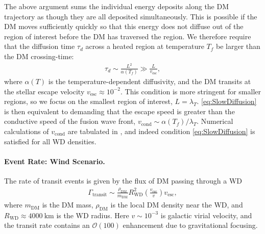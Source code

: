 \documentclass[twocolumn, preprintnumbers,amsmath,amssymb,prd, superscriptaddress]{revtex4}
\newcommand{\OO}{\mathcal{O}}
\def\r{\right)}
\def\l{\left(}
\begin{document}
The above argument sums the individual energy deposits along the DM trajectory as though they are all deposited simultaneously.
This is possible if the DM moves sufficiently quickly so that this energy does not diffuse out of the region of interest before the DM has traversed the region.
We therefore require that the diffusion time $\tau_d$ across a heated region at temperature $T_f$ be larger than the DM crossing-time:
\begin{align}
  \tau_d \sim \frac{L^2}{\alpha(T_f)} \gg
  \frac{L}{v_\text{esc}},
\label{eq:SlowDiffusion}
\end{align}
where $\alpha(T)$ is the temperature-dependent diffusivity, and the DM transits at the stellar escape velocity $v_\text{esc} \approx 10^{-2}$.
This condition is more stringent for smaller regions, so we focus on the smallest region of interest, $L = \lambda_T$.
\eqref{eq:SlowDiffusion} is then equivalent to demanding that the escape speed is greater than the conductive speed of the fusion wave front, $v_\text{cond} \sim \alpha(T_f) / \lambda_T$.
Numerical calculations of $v_\text{cond}$ are tabulated in \cite{Woosley}, and indeed condition \eqref{eq:SlowDiffusion} is satisfied for all WD densities.

\paragraph{Event Rate: Wind Scenario.}
The rate of transit events is given by the flux of DM passing through a WD
\begin{align}
  \Gamma_\text{transit} \sim
  \frac{\rho_{\text{DM}}}{m_\text{DM}} R_\text{WD}^2
  \l\frac{v_\text{esc}}{v}\r v_\text{esc},
\label{eq:TransitFluxCondition}
\end{align}
where $m_\text{DM}$ is the DM mass, $\rho_\text{DM}$ is the local DM density near the WD, and $R_\text{WD} \approx 4000 ~\text{km}$ is the WD radius.
Here $v \sim 10^{-3}$ is galactic virial velocity, and the transit rate contains an $\OO(100)$ enhancement due to gravitational focusing.
\end{document}

